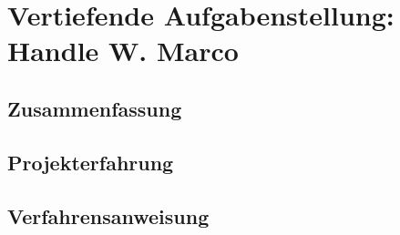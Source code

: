 \chapter[Handle]{Vertiefende Aufgabenstellung: Handle W. Marco}

\section{Zusammenfassung}

\section{Projekterfahrung}

\section{Verfahrensanweisung}